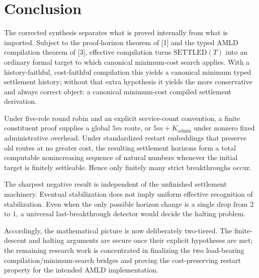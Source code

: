 \documentclass[11pt]{article}
\theoremstyle{definition}
\newcommand{\SETTLED}{\ensuremath{\mathrm{SETTLED}}}
\begin{document}
\section{Conclusion}
The corrected synthesis separates what is proved internally from what is imported. Subject to the proof-horizon theorem of [1] and the typed AMLD compilation theorem of [3], effective compilation turns $\SETTLED(T)$ into an ordinary formal target to which canonical minimum-cost search applies. With a history-faithful, cost-faithful compilation this yields a canonical minimum typed settlement history; without that extra hypothesis it yields the more conservative and always correct object: a canonical minimum-cost compiled settlement derivation.

Under five-role round robin and an explicit service-count convention, a finite constituent proof supplies a global $5m$ route, or $5m+K_{\mathrm{admin}}$ under nonzero fixed administrative overhead. Under standardized restart embeddings that preserve old routes at no greater cost, the resulting settlement horizons form a total computable nonincreasing sequence of natural numbers whenever the initial target is finitely settleable. Hence only finitely many strict breakthroughs occur.

The sharpest negative result is independent of the unfinished settlement machinery. Eventual stabilization does not imply uniform effective recognition of stabilization. Even when the only possible horizon change is a single drop from $2$ to $1$, a universal last-breakthrough detector would decide the halting problem.

Accordingly, the mathematical picture is now deliberately two-tiered. The finite-descent and halting arguments are secure once their explicit hypotheses are met; the remaining research work is concentrated in finalizing the two load-bearing compilation/minimum-search bridges and proving the cost-preserving restart property for the intended AMLD implementation.
\end{document}
